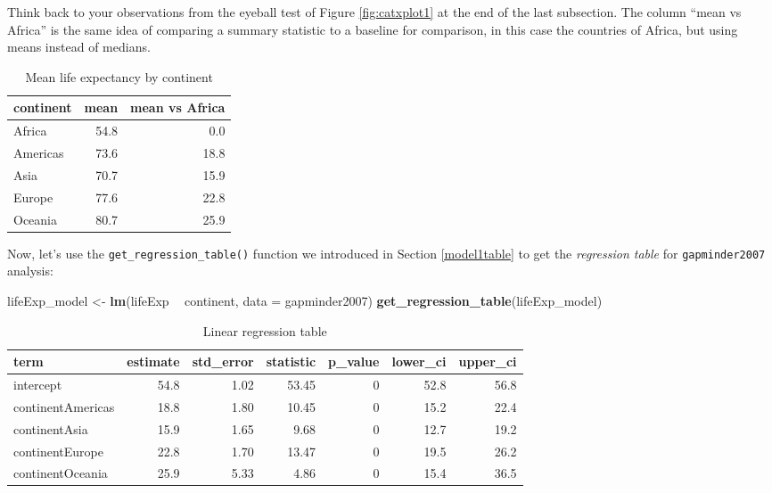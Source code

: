 \documentclass[12pt, krantz2,]{krantz}
\makeatletter
\newenvironment{Shaded}{\begin{snugshade}}{\end{snugshade}}
\newcommand{\DataTypeTok}[1]{\textcolor[rgb]{0.27,0.27,0.27}{#1}}
\newcommand{\KeywordTok}[1]{\textcolor[rgb]{0.27,0.27,0.27}{\textbf{#1}}}
\newcommand{\NormalTok}[1]{#1}
\newcommand{\OperatorTok}[1]{\textcolor[rgb]{0.43,0.43,0.43}{\textbf{#1}}}
\newcommand{\StringTok}[1]{\textcolor[rgb]{0.5,0.5,0.5}{#1}}
\newenvironment{kframe}{%
\medskip{}
\setlength{\fboxsep}{.8em}
 \def\at@end@of@kframe{}%
 \ifinner\ifhmode%
  \def\at@end@of@kframe{\end{minipage}}%
  \begin{minipage}{\columnwidth}%
 \fi\fi%
 \def\FrameCommand##1{\hskip\@totalleftmargin \hskip-\fboxsep
 \colorbox{shadecolor}{##1}\hskip-\fboxsep
     \hskip-\linewidth \hskip-\@totalleftmargin \hskip\columnwidth}%
 \MakeFramed {\advance\hsize-\width
   \@totalleftmargin\z@ \linewidth\hsize
   \@setminipage}}%
 {\par\unskip\endMakeFramed%
 \at@end@of@kframe}
\renewenvironment{Shaded}{\begin{kframe}}{\end{kframe}}
\makeatother
\begin{document}
Think back to your observations from the eyeball test of Figure \ref{fig:catxplot1} at the end of the last subsection. The column ``mean vs Africa'' is the same idea of comparing a summary statistic to a baseline for comparison, in this case the countries of Africa, but using means instead of medians.

\begin{table}[H]

\caption{\label{tab:continent-mean-life-expectancies}Mean life expectancy by continent}
\centering
\fontsize{10}{12}\selectfont
\begin{tabular}{lrr}
\toprule
continent & mean & mean vs Africa\\
\midrule
Africa & 54.8 & 0.0\\
Americas & 73.6 & 18.8\\
Asia & 70.7 & 15.9\\
Europe & 77.6 & 22.8\\
Oceania & 80.7 & 25.9\\
\bottomrule
\end{tabular}
\end{table}

Now, let's use the \texttt{get\_regression\_table()} function we introduced in Section \ref{model1table} to get the \emph{regression table} for \texttt{gapminder2007} analysis:

\begin{Shaded}
\begin{Highlighting}[]
\NormalTok{lifeExp_model <-}\StringTok{ }\KeywordTok{lm}\NormalTok{(lifeExp }\OperatorTok{~}\StringTok{ }\NormalTok{continent, }\DataTypeTok{data =}\NormalTok{ gapminder2007)}
\KeywordTok{get_regression_table}\NormalTok{(lifeExp_model)}
\end{Highlighting}
\end{Shaded}

\begin{table}[H]

\caption{\label{tab:catxplot4b}Linear regression table}
\centering
\fontsize{10}{12}\selectfont
\begin{tabular}{lrrrrrr}
\toprule
term & estimate & std\_error & statistic & p\_value & lower\_ci & upper\_ci\\
\midrule
intercept & 54.8 & 1.02 & 53.45 & 0 & 52.8 & 56.8\\
continentAmericas & 18.8 & 1.80 & 10.45 & 0 & 15.2 & 22.4\\
continentAsia & 15.9 & 1.65 & 9.68 & 0 & 12.7 & 19.2\\
continentEurope & 22.8 & 1.70 & 13.47 & 0 & 19.5 & 26.2\\
continentOceania & 25.9 & 5.33 & 4.86 & 0 & 15.4 & 36.5\\
\bottomrule
\end{tabular}
\end{table}
\end{document}

